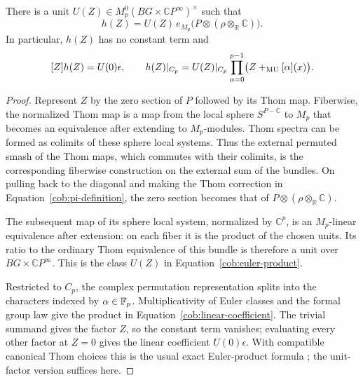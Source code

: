\begin{lemma}
 \label{cob:euler-power}
 There is a unit
 $U(Z)\in M_p^0(BG\times\mathbb CP^\infty)^\times$ such that
 \begin{equation}
  \label{cob:euler-product}
  h(Z)=U(Z)\,e_{M_p}\bigl(P\otimes
                      (\rho\otimes_{\mathbb R}\mathbb C)\bigr).
 \end{equation}
 In particular, $h(Z)$ has no constant term and
 \begin{equation}
  \label{cob:linear-coefficient}
  [Z]h(Z)=U(0)\epsilon,
  \qquad
  h(Z)|_{C_p}=U(Z)|_{C_p}
          \prod_{\alpha=0}^{p-1}\bigl(Z+_{\mathrm{MU}}[\alpha](x)\bigr).
 \end{equation}
\end{lemma}

\begin{proof}
 Represent $Z$ by the zero section of $P$ followed by its Thom map.
 Fiberwise, the normalized Thom map is a map from the local sphere
 $S^{P-\mathbb C}$ to $M_p$ that becomes an equivalence after
 extending to $M_p$-modules.  Thom spectra can be formed as colimits
 of these sphere local systems.  Thus the external permuted smash
 of the Thom maps, which commutes with their colimits, is the
 corresponding fiberwise construction on the external sum of the
 bundles.  On pulling back to the diagonal and making the Thom
 correction in Equation~\eqref{cob:pi-definition}, the zero section
 becomes that of
 $P\otimes(\rho\otimes_{\mathbb R}\mathbb C)$.

 The subsequent map of its sphere local system, normalized by
 $\mathbb C^p$, is an $M_p$-linear equivalence after extension: on
 each fiber it is the product of the chosen units.  Its ratio to
 the ordinary Thom equivalence of this bundle is therefore a unit
 over $BG\times\mathbb CP^\infty$.  This is the class $U(Z)$ in
 Equation~\eqref{cob:euler-product}.

 Restricted to $C_p$, the complex permutation representation splits
 into the characters indexed by $\alpha\in\mathbb F_p$.  Multiplicativity
 of Euler classes and the formal group law give the product in
 Equation~\eqref{cob:linear-coefficient}.  The trivial summand gives
 the factor $Z$, so the constant term vanishes; evaluating every
 other factor at $Z=0$ gives the linear coefficient $U(0)\epsilon$.
 With compatible canonical Thom choices this is the usual exact
 Euler-product formula
 \cite[Equations~(4.11) and~(4.14)]{JohnsonNoel2010}; the unit-factor
 version suffices here.
\end{proof}

